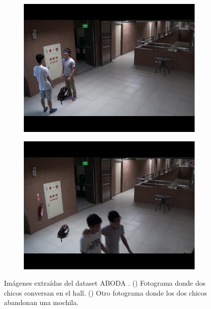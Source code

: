 \begin{figure}[ht]
  \centering
  \begin{subfigure}[b]{0.4\textwidth}
    \includegraphics[width=\textwidth]{img/chapters/resultados/datasets/aboda_1.jpg}
    \caption{}
    \label{fig:aboda_1}
  \end{subfigure}
  \qquad\qquad
  \begin{subfigure}[b]{0.4\textwidth}
    \includegraphics[width=\textwidth]{img/chapters/resultados/datasets/aboda_2.jpg}
    \caption{}
    \label{fig:aboda_2}
  \end{subfigure}
  \caption{Imágenes extraídas del dataset ABODA \cite{aboda-dataset}.
    (\protect{}) Fotograma donde dos chicos conversan en el hall.
    (\protect{}) Otro fotograma donde los dos chicos abandonan una mochila.}
  \label{fig:aboda1}
\end{figure}

